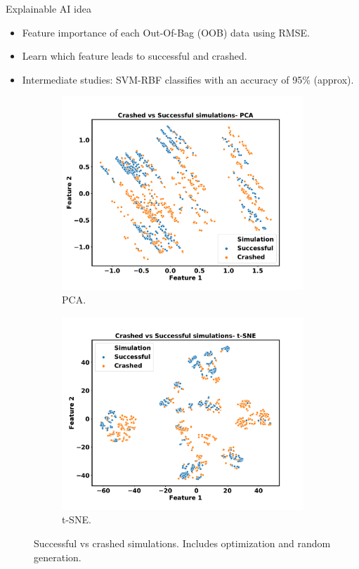 \documentclass[10pt]{beamer}
\begin{document}
\begin{frame}{Explainable AI idea}

\begin{itemize}
\item Feature importance of each Out-Of-Bag (OOB) data using RMSE.
\item Learn which feature leads to successful and crashed.
\item Intermediate studies: SVM-RBF classifies with an accuracy of 95\% (approx).
\end{itemize}
    \begin{figure}[!ht]
        \centering
      \begin{subfigure}{.5\textwidth}
          \centering
          \includegraphics[width=\linewidth]{images/pca.pdf}
          \caption{PCA.}
    \end{subfigure}%
     \begin{subfigure}{.5\textwidth}
          \centering
          \includegraphics[width=\linewidth]{images/tsne.pdf}
          \caption{t-SNE.}
    \end{subfigure}
        \caption{Successful vs crashed simulations. Includes optimization and random generation.}
        \label{Fig:explainableAI}
    \end{figure}
\end{frame}
\end{document}
